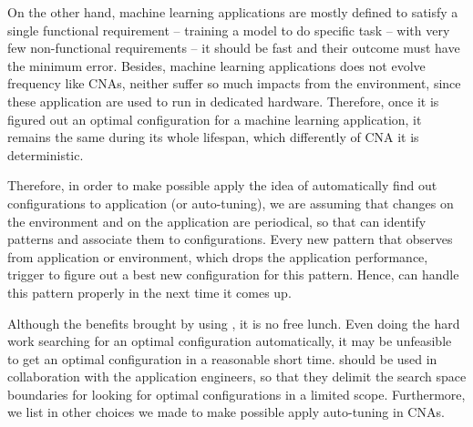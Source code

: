 On the other hand, machine learning applications are mostly defined to satisfy a
single functional requirement -- training a model to do specific task -- with
very few non-functional requirements -- it should be fast and their outcome must
have the minimum error.  Besides, machine learning applications does not evolve
frequency like CNAs, neither suffer so much impacts from the environment, since
these application are used to run in dedicated hardware.  Therefore, once it is
figured out an optimal configuration for a machine learning application, it
remains the same during its whole lifespan, which differently of CNA it is
deterministic.

Therefore, in order to make possible apply the idea of automatically find out
configurations to application (or auto-tuning), we are assuming that changes on
the environment and on the application are periodical, so that \name can
identify patterns and associate them to configurations. Every new pattern that
\name observes from application or environment, which drops the application
performance, trigger \name to figure out a best new configuration for this
pattern. Hence, \name can handle this pattern properly in the next time it comes
up.

Although the benefits brought by using \name, it is no free lunch. Even \name
doing the hard work searching for an optimal configuration automatically, it may
be unfeasible to get an optimal configuration in a reasonable short time.  \name
should be used in collaboration with the application engineers, so that they
delimit the search space boundaries for \name looking for optimal configurations
in a limited scope. Furthermore, we list in  other
choices we made to make possible apply auto-tuning in CNAs.
